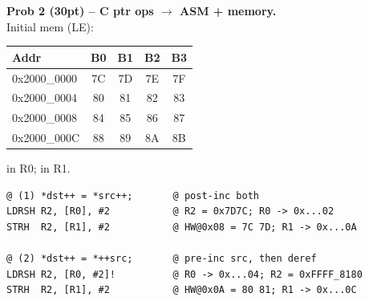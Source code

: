 \begin{qp}\textbf{Prob 2 (30pt) -- C ptr ops $\to$ ASM + memory.}\\
Initial mem (LE):
\begin{center}\scriptsize
\begin{tabular}{@{}lcccc@{}}
\toprule
Addr & B0 & B1 & B2 & B3 \\
\midrule
0x2000\_0000 & 7C & 7D & 7E & 7F \\
0x2000\_0004 & 80 & 81 & 82 & 83 \\
0x2000\_0008 & 84 & 85 & 86 & 87 \\
0x2000\_000C & 88 & 89 & 8A & 8B \\
\bottomrule
\end{tabular}
\end{center}
 in R0;  in R1.
\begin{lstlisting}
@ (1) *dst++ = *src++;       @ post-inc both
LDRSH R2, [R0], #2           @ R2 = 0x7D7C; R0 -> 0x...02
STRH  R2, [R1], #2           @ HW@0x08 = 7C 7D; R1 -> 0x...0A

@ (2) *dst++ = *++src;       @ pre-inc src, then deref
LDRSH R2, [R0, #2]!          @ R0 -> 0x...04; R2 = 0xFFFF_8180
STRH  R2, [R1], #2           @ HW@0x0A = 80 81; R1 -> 0x...0C


\end{lstlisting}
\end{qp}
